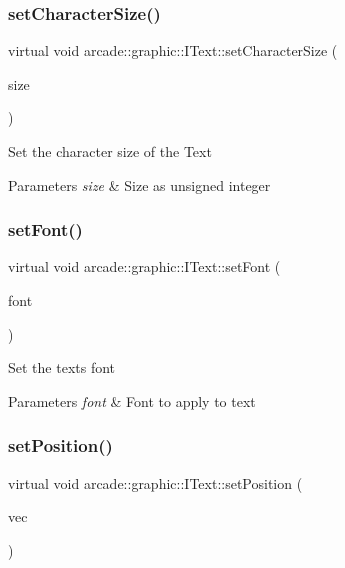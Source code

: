 \subsubsection{\texorpdfstring{setCharacterSize()}{setCharacterSize()}}
{\footnotesize\ttfamily virtual void arcade\+::graphic\+::\+I\+Text\+::set\+Character\+Size (\begin{DoxyParamCaption}\item[{unsigned int}]{size }\end{DoxyParamCaption})\hspace{0.3cm}{\ttfamily [pure virtual]}}

Set the character size of the Text 
\begin{DoxyParams}{Parameters}
{\em size} & Size as unsigned integer \\
\hline
\end{DoxyParams}
\mbox{\label{classarcade_1_1graphic_1_1_i_text_afd47effbd52bab68990f16d694b630a6}} 
\subsubsection{\texorpdfstring{setFont()}{setFont()}}
{\footnotesize\ttfamily virtual void arcade\+::graphic\+::\+I\+Text\+::set\+Font (\begin{DoxyParamCaption}\item[{Font\+Ptr}]{font }\end{DoxyParamCaption})\hspace{0.3cm}{\ttfamily [pure virtual]}}

Set the text\textquotesingle{}s font 
\begin{DoxyParams}{Parameters}
{\em font} & Font to apply to text \\
\hline
\end{DoxyParams}
\mbox{\label{classarcade_1_1graphic_1_1_i_text_a26ba9fb577a40e24a08081dd3f79af34}} 
\subsubsection{\texorpdfstring{setPosition()}{setPosition()}}
{\footnotesize\ttfamily virtual void arcade\+::graphic\+::\+I\+Text\+::set\+Position (\begin{DoxyParamCaption}\item[{const \mbox{\hyperlink{classarcade_1_1graphic_1_1_i_vector2f}{I\+Vector2f}} \&}]{vec }\end{DoxyParamCaption})\hspace{0.3cm}{\ttfamily [pure virtual]}}

